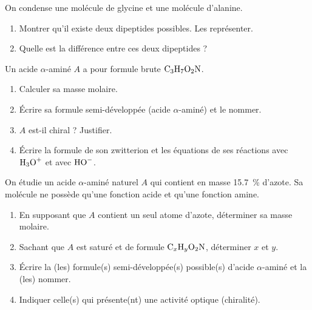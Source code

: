 \exo{} On condense une molécule de glycine et une molécule d'alanine.
\begin{enumerate}[label=\arabic*)]
\item Montrer qu'il existe deux dipeptides possibles. Les représenter.
\item Quelle est la différence entre ces deux dipeptides ?
\end{enumerate}


\exo{} Un acide $\alpha$-aminé $A$ a pour formule brute $\ce{C3H7O2N}$.
\begin{enumerate}[label=\arabic*)]
\item Calculer sa masse molaire.
\item Écrire sa formule semi-développée (acide $\alpha$-aminé) et le nommer.
\item $A$ est-il chiral ? Justifier.
\item Écrire la formule de son zwitterion et les équations de ses réactions avec
$\ce{H3O+}$ et avec $\ce{HO-}$.
\end{enumerate}


On étudie un acide $\alpha$-aminé naturel $A$ qui contient en masse \SI{15.7}{\percent}
d'azote. Sa molécule ne possède qu'une fonction acide et qu'une fonction amine.
\begin{enumerate}[label=\arabic*)]
\item En supposant que $A$ contient un seul atome d'azote, déterminer sa masse molaire.
\item Sachant que $A$ est saturé et de formule $\ce{C_xH_yO2N}$, déterminer $x$ et $y$.
\item Écrire la (les) formule(s) semi-développée(s) possible(s) d'acide
$\alpha$-aminé et la (les) nommer.
\item Indiquer celle(s) qui présente(nt) une activité optique (chiralité).
\end{enumerate}
